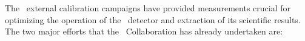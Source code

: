 

The \DSs\ external calibration campaigns have provided measurements crucial for optimizing the operation of the \DSfs\ detector and extraction of its scientific results. The two major efforts that the \GADMC\ Collaboration has already undertaken are:

